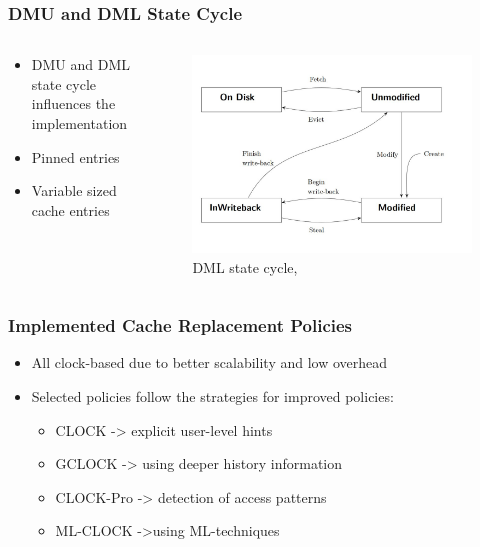 \documentclass[
	aspectratio=169,
	compress,
]{beamer}
\newcommand{\navframetitle}[1]{\frametitle{#1\hfill{\footnotesize\lastsection{}}}}
\begin{document}
\begin{frame}
	\navframetitle{DMU and DML State Cycle}

	\begin{columns}
		\begin{column}{0.5\textwidth}
			\begin{itemize}
				\item DMU and DML state cycle influences the implementation
				\item Pinned entries 
				\item Variable sized cache entries	
			\end{itemize}
		\end{column}
		\begin{column}{0.5\textwidth}
			\begin{figure}[ht]
    			\centering
    			\includegraphics[scale=0.2]{DML_state_cycle.jpg}
    			\caption{DML state cycle, \cite{wiedemann2018modern}}
        		\label{fig:DML state cycle}
			\end{figure}			
		\end{column}
	\end{columns}
\end{frame}

\begin{frame}
	\navframetitle{Implemented Cache Replacement Policies}

	\begin{itemize}
		\item All clock-based due to better scalability and low overhead
		\item Selected policies follow the strategies for improved policies:
		\begin{itemize}
			\item CLOCK -> explicit user-level hints
    		\item GCLOCK -> using deeper history information
    		\item CLOCK-Pro -> detection of access patterns
    		\item ML-CLOCK ->using ML-techniques
	\end{itemize}
		
	\end{itemize}
\end{frame}
\end{document}
